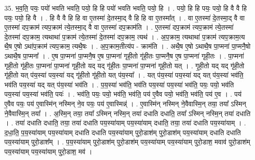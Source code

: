 \documentclass[17pt]{extarticle}
\begin{document}
35. भ॒व॒ति॒ पयः॒ पयो॑ भवति भवति॒ पयो॒ हि हि पयो॑ भवति भवति॒ पयो॒ हि । . पयो॒ हि हि पयः॒ पयो॒ हि वै वै हि पयः॒ पयो॒ हि वै । . हि वै वै हि हि वा ए॒तस्मा॑ दे॒तस्मा॒द् वै हि हि वा ए॒तस्मा᳚त् । . वा ए॒तस्मा॑ दे॒तस्मा॒द् वै वा ए॒तस्मा॑ दप॒क्राम॑ त्यप॒क्राम॑ त्ये॒तस्मा॒द् वै वा ए॒तस्मा॑ दप॒क्राम॑ति । . ए॒तस्मा॑ दप॒क्राम॑ त्यप॒क्राम॑ त्ये॒तस्मा॑ दे॒तस्मा॑ दप॒क्राम॒ त्यथाथा॑ प॒क्राम॑ त्ये॒तस्मा॑ दे॒तस्मा॑ दप॒क्राम॒ त्यथ॑ । . अ॒प॒क्राम॒ त्यथाथा॑ प॒क्राम॑ त्यप॒क्राम॒त्य थै॒ष ए॒षो ऽथा॑प॒क्राम॑ त्यप॒क्राम॒ त्यथै॒षः । . अ॒प॒क्राम॒तीत्य॑प - क्राम॑ति । . अथै॒ष ए॒षो ऽथाथै॒ष पा॒प्मना॑ पा॒प्मनै॒षो ऽथाथै॒ष पा॒प्मना᳚ । . ए॒ष पा॒प्मना॑ पा॒प्मनै॒ष ए॒ष पा॒प्मना॑ गृही॒तो गृ॑ही॒तः पा॒प्मनै॒ष ए॒ष पा॒प्मना॑ गृही॒तः । . पा॒प्मना॑ गृही॒तो गृ॑ही॒तः पा॒प्मना॑ पा॒प्मना॑ गृही॒तो यद् यद् गृ॑ही॒तः पा॒प्मना॑ पा॒प्मना॑ गृही॒तो यत् । . गृ॒ही॒तो यद् यद् गृ॑ही॒तो गृ॑ही॒तो यत् प॑य॒स्या॑ पय॒स्या॑ यद् गृ॑ही॒तो गृ॑ही॒तो यत् प॑य॒स्या᳚ । . यत् प॑य॒स्या॑ पय॒स्या॑ यद् यत् प॑य॒स्या॑ भव॑ति॒ भव॑ति पय॒स्या॑ यद् यत् प॑य॒स्या॑ भव॑ति । . प॒य॒स्या॑ भव॑ति॒ भव॑ति पय॒स्या॑ पय॒स्या॑ भव॑ति॒ पयः॒ पयो॒ भव॑ति पय॒स्या॑ पय॒स्या॑ भव॑ति॒ पयः॑ । . भव॑ति॒ पयः॒ पयो॒ भव॑ति॒ भव॑ति॒ पय॑ ए॒वैव पयो॒ भव॑ति॒ भव॑ति॒ पय॑ ए॒व । . पय॑ ए॒वैव पयः॒ पय॑ ए॒वास्मि॑न् नस्मिन् ने॒व पयः॒ पय॑ ए॒वास्मिन्न्॑ । . ए॒वास्मि॑न् नस्मिन् ने॒वैवास्मि॒न् तया॒ तया᳚ ऽस्मिन् ने॒वैवास्मि॒न् तया᳚ । . अ॒स्मि॒न् तया॒ तया᳚ ऽस्मिन् नस्मि॒न् तया॑ दधाति दधाति॒ तया᳚ ऽस्मिन् नस्मि॒न् तया॑ दधाति । . तया॑ दधाति दधाति॒ तया॒ तया॑ दधाति पय॒स्या॑याम् पय॒स्या॑याम् दधाति॒ तया॒ तया॑ दधाति पय॒स्या॑याम् । . द॒धा॒ति॒ प॒य॒स्या॑याम् पय॒स्या॑याम् दधाति दधाति पय॒स्या॑याम् पुरो॒डाश॑म् पुरो॒डाश॑म् पय॒स्या॑याम् दधाति दधाति पय॒स्या॑याम् पुरो॒डाश᳚म् । . प॒य॒स्या॑याम् पुरो॒डाश॑म् पुरो॒डाश॑म् पय॒स्या॑याम् पय॒स्या॑याम् पुरो॒डाश॒ मवाव॑ पुरो॒डाश॑म् पय॒स्या॑याम् पय॒स्या॑याम् पुरो॒डाश॒ मव॑ । \newline
\pagebreak
{}
\end{document}
